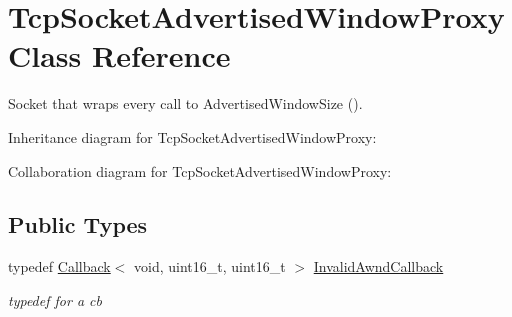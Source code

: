 \hypertarget{classTcpSocketAdvertisedWindowProxy}{}\section{Tcp\+Socket\+Advertised\+Window\+Proxy Class Reference}
\label{classTcpSocketAdvertisedWindowProxy}


Socket that wraps every call to Advertised\+Window\+Size ().  




Inheritance diagram for Tcp\+Socket\+Advertised\+Window\+Proxy\+:


Collaboration diagram for Tcp\+Socket\+Advertised\+Window\+Proxy\+:
\subsection*{Public Types}
\begin{DoxyCompactItemize}
\item 
typedef \hyperlink{classns3_1_1Callback}{Callback}$<$ void, uint16\+\_\+t, uint16\+\_\+t $>$ \hyperlink{classTcpSocketAdvertisedWindowProxy_aac665ab91330f420bf157fc0a28d3c87}{Invalid\+Awnd\+Callback}
\begin{DoxyCompactList}\small\item\em typedef for a cb \end{DoxyCompactList}\end{DoxyCompactItemize}
